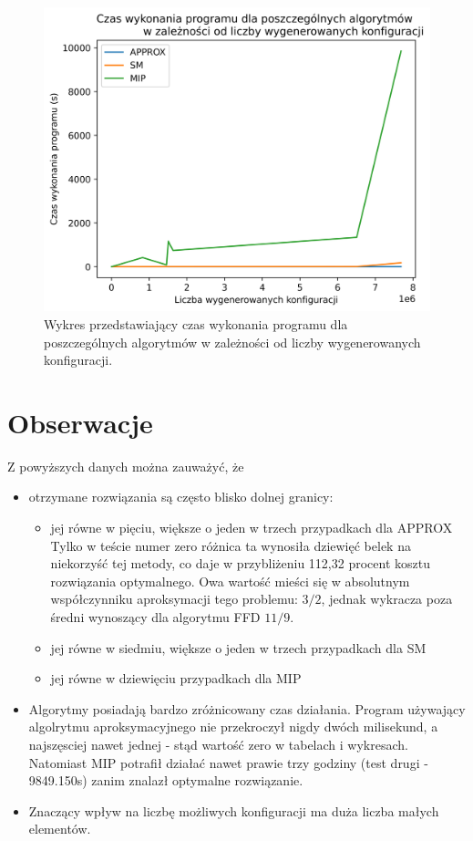 \begin{figure}[H]
	\begin{center}
		\includegraphics[width=12cm]{plots/time_configs}
		\caption{Wykres przedstawiający czas wykonania programu dla poszczególnych algorytmów w zależności od liczby wygenerowanych konfiguracji.}
	\end{center}
\end{figure}

\section{Obserwacje}

Z powyższych danych można zauważyć, że
\begin{itemize}
	\item otrzymane rozwiązania są często blisko dolnej granicy:
	\begin{itemize}
		\item jej równe w pięciu, większe o jeden w trzech przypadkach dla APPROX \\
		Tylko w teście numer zero różnica ta wynosiła dziewięć belek na niekorzyść tej metody, co daje w przybliżeniu 112,32 procent kosztu rozwiązania optymalnego. Owa wartość mieści się w absolutnym współczynniku aproksymacji tego problemu: $3/2$, jednak wykracza poza średni wynoszący dla algorytmu FFD $11/9$.
		\item jej równe w siedmiu, większe o jeden w trzech przypadkach dla SM
		\item jej równe w dziewięciu przypadkach dla MIP
	\end{itemize}
	\item Algorytmy posiadają bardzo zróżnicowany czas działania.
	Program używający algolrytmu aproksymacyjnego nie przekroczył nigdy dwóch milisekund, a najszęsciej nawet jednej - stąd wartość zero w tabelach i wykresach. Natomiast MIP potrafił działać nawet prawie trzy godziny (test drugi - 9849.150s) zanim znalazł optymalne rozwiązanie. 
	\item Znaczący wpływ na liczbę możliwych konfiguracji ma duża liczba małych elementów.
	
\end{itemize}

